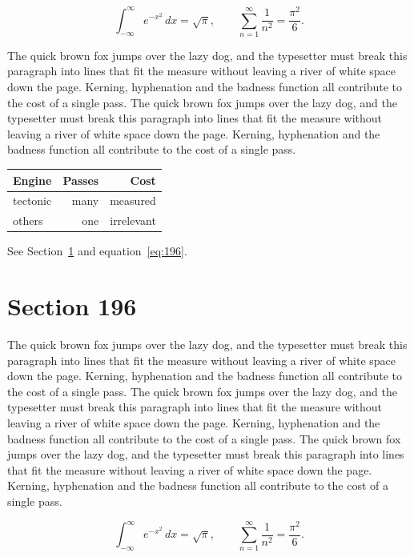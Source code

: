 \documentclass{article}
\begin{document}
\begin{equation}\label{eq:195}
\int_{-\infty}^{\infty} e^{-x^{2}}\,dx = \sqrt{\pi}, \qquad
\sum_{n=1}^{\infty} \frac{1}{n^{2}} = \frac{\pi^{2}}{6}.
\end{equation}

The quick brown fox jumps over the lazy dog, and the typesetter must break this paragraph into lines that fit the measure without leaving a river of white space down the page. Kerning, hyphenation and the badness function all contribute to the cost of a single pass. The quick brown fox jumps over the lazy dog, and the typesetter must break this paragraph into lines that fit the measure without leaving a river of white space down the page. Kerning, hyphenation and the badness function all contribute to the cost of a single pass. 

\begin{center}
\begin{tabular}{lrr}
\toprule
Engine & Passes & Cost \\
\midrule
tectonic & many & measured \\
others & one & irrelevant \\
\bottomrule
\end{tabular}
\end{center}

See Section~\ref{sec:196} and equation~\eqref{eq:196}.
\section{Section 196}
\label{sec:196}
The quick brown fox jumps over the lazy dog, and the typesetter must break this paragraph into lines that fit the measure without leaving a river of white space down the page. Kerning, hyphenation and the badness function all contribute to the cost of a single pass. The quick brown fox jumps over the lazy dog, and the typesetter must break this paragraph into lines that fit the measure without leaving a river of white space down the page. Kerning, hyphenation and the badness function all contribute to the cost of a single pass. The quick brown fox jumps over the lazy dog, and the typesetter must break this paragraph into lines that fit the measure without leaving a river of white space down the page. Kerning, hyphenation and the badness function all contribute to the cost of a single pass. 

\begin{equation}\label{eq:196}
\int_{-\infty}^{\infty} e^{-x^{2}}\,dx = \sqrt{\pi}, \qquad
\sum_{n=1}^{\infty} \frac{1}{n^{2}} = \frac{\pi^{2}}{6}.
\end{equation}
\end{document}
